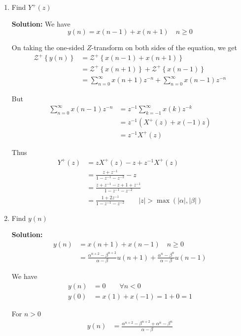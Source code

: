\documentclass[journal,12pt,twocolumn]{IEEEtran}
\newcommand{\solution}{\noindent \textbf{Solution: }}
\providecommand{\brak}[1]{\ensuremath{\left(#1\right)}}
\providecommand{\cbrak}[1]{\ensuremath{\left\{#1\right\}}}
\providecommand{\abs}[1]{\left\vert#1\right\vert}
\numberwithin{equation}{section}
\renewcommand\thesection{\arabic{section}}
\begin{document}
\begin{enumerate}[label=\thesection.\arabic*,ref=\thesection.\theenumi]
\item Find $Y^{+}(z)$

\solution We have
\begin{equation}
	y(n) = x(n-1) + x(n+1) \quad n \ge 0
\end{equation}

On taking the one-sided $Z$-transform on both sides of the equation, we get
\begin{align}
\mathcal{Z}^+\cbrak{y(n)} &= \mathcal{Z}^+\cbrak{x(n-1) + x(n+1)} \\
 &= \mathcal{Z}^+\cbrak{x(n + 1)} + \mathcal{Z}^+\cbrak{x(n - 1)} \\
 &= \sum_{n=0}^\infty x(n+1)z^{-n} + \sum_{n=0}^\infty x(n-1)z^{-n}
\end{align}

But
\begin{align}
	\sum_{n=0}^\infty x(n-1)z^{-n} &= z^{-1}\sum_{k=-1}^\infty x(k)z^{-k} \\
	&= z^{-1} \brak{X^+(z) + x(-1)z} \\
	&= z^{-1} X^+(z)
\end{align}

Thus
\begin{align}
Y^+(z) &= zX^+(z) - z + z^{-1}X^+(z)  \\
&= \frac{z + z^{-1}}{1 - z^{-1} - z^{-2}} - z \\
&= \frac{z + z^{-1} - z + 1 + z^{-1}}{1 - z^{-1} - z^{-2}} \\
&= \frac{1 + 2z^{-1}}{1 - z^{-1} - z^{-2}} \qquad |z| > \max\brak{\abs{\alpha}, \abs{\beta}}
\end{align}

\item Find $y(n)$

\solution 
\begin{align}
	y(n) &= x(n+1) + x(n-1) \quad n \ge 0 \\
	&= \frac{\alpha^{n+2} - \beta^{n+2}}{\alpha - \beta} u(n+1) + \frac{\alpha^{n} - \beta^{n}}{\alpha - \beta} u(n-1)
\end{align}

We have
\begin{align}
	y(n) &= 0 \qquad \forall n < 0 \\
	y(0) &= x(1) + x(-1) = 1 + 0 = 1
\end{align}

For $n > 0$
\begin{align}
	y(n) &= \frac{\alpha^{n+2} - \beta^{n+2} + \alpha^{n} - \beta^{n}}{\alpha - \beta}
\end{align}


\end{enumerate}
\end{document}
